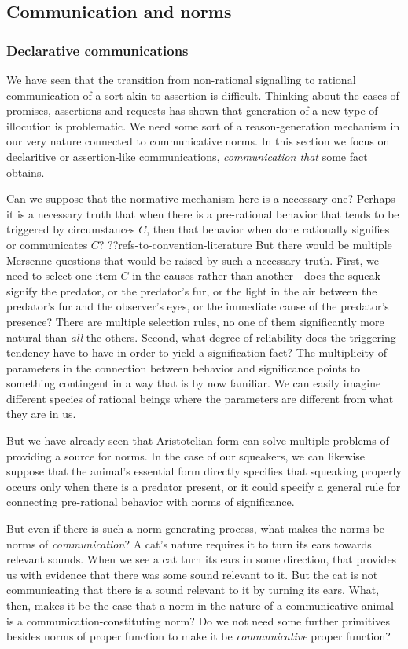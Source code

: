 \subsection{Communication and norms}
\subsubsection{Declarative communications}
We have seen that the transition from non-rational signalling to rational communication of a sort akin to assertion
is difficult. Thinking
about the cases of promises, assertions and requests has shown that generation of a new type of illocution is 
problematic. We need some sort of a reason-generation mechanism in our very nature connected to communicative
norms. In this section we focus on declaritive or assertion-like communications, \textit{communication that} some fact obtains.

Can we suppose that the normative mechanism here is a necessary one? Perhaps it is a necessary truth that when
there is a pre-rational behavior that tends to be triggered by circumstances $C$, then that behavior when done rationally
signifies or communicates $C$? ??refs-to-convention-literature 
But there would be multiple Mersenne questions that would be raised by such a necessary truth. First,
we need to select one item $C$ in the causes rather than another---does the squeak signify the predator, or the predator's fur, or the
light in the air between the predator's fur and the observer's eyes, or the immediate cause of the predator's presence? 
There are multiple selection rules, 
no one of them significantly more natural than \textit{all} the others. Second, what degree of reliability does the 
triggering tendency have to have in order to yield a signification fact? 
The multiplicity of parameters in the connection between behavior and
significance points to something contingent in a way that is by now familiar. 
We can easily imagine different species of rational beings where the parameters are
different from what they are in us. 

But we have already seen that Aristotelian form can solve multiple problems of providing a source for norms.
In the case of our squeakers, we can likewise suppose that the animal's essential form directly specifies that squeaking properly occurs only when there is a 
predator present, or it could specify a general rule for connecting pre-rational behavior with norms of significance. 

But even if there is such a norm-generating process, what makes the norms be norms of \textit{communication}? A cat's nature 
requires it to turn its ears towards relevant sounds. When we see a cat turn its ears in some direction, that provides us with 
evidence that there was some sound relevant to it. But the cat is not communicating that there is a sound relevant to it by
turning its ears. What, then, makes it be the case that a norm in the nature of a communicative animal is a communication-constituting
norm? Do we not need some further primitives besides norms of proper function to make it be \textit{communicative} proper function?

